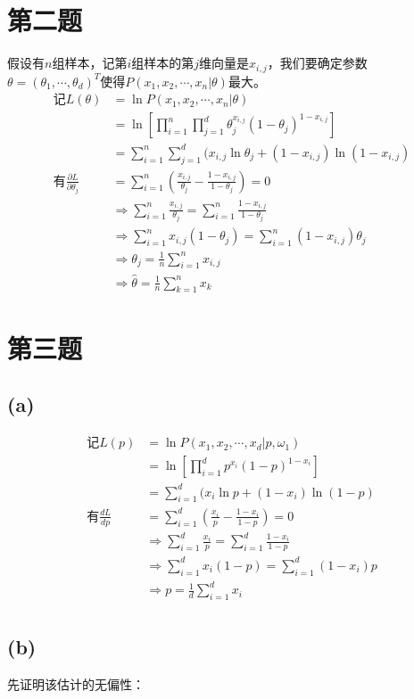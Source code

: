 \documentclass{ctexart}
\begin{document}
\section*{第二题}
假设有$n$组样本，记第$i$组样本的第$j$维向量是$x_{i,j}$，我们要确定参数$\theta=(\theta_1,\cdots,\theta_d)^T$使得$P(x_1,x_2,\cdots,x_n|\theta)$最大。
\begin{align*}
\textrm{记}L(\theta)&=\ln P(x_1,x_2,\cdots,x_n|\theta)\\
&=\ln [ \prod_{i=1}^n\prod_{j=1}^d \theta_j^{x_{i,j}}(1-\theta_j)^{1-x_{i,j}} ]\\
&=\sum_{i=1}^n\sum_{j=1}^d (x_{i,j}\ln \theta_j+(1-x_{i,j})\ln(1-x_{i,j})\\
\textrm{有}\frac{\partial L}{\partial \theta_j}&=\sum_{i=1}^n (\frac{x_{i,j}}{\theta_j}-\frac{1-x_{i,j}}{1-\theta_j})=0\\
&\Longrightarrow \sum_{i=1}^n \frac{x_{i,j}}{\theta_j}=\sum_{i=1}^n \frac{1-x_{i,j}}{1-\theta_j}\\
&\Longrightarrow \sum_{i=1}^n x_{i,j}(1-\theta_j)=\sum_{i=1}^n (1-x_{i,j})\theta_j\\
&\Longrightarrow \theta_j=\frac{1}{n}\sum_{i=1}^n x_{i,j}\\
&\Longrightarrow \hat{\theta}=\frac{1}{n}\sum_{k=1}^n x_k
\end{align*}
\section*{第三题}
\subsection*{(a)}
\begin{align*}
\textrm{记}L(p)&=\ln P(x_1,x_2,\cdots,x_d|p,\omega_1)\\
&=\ln [ \prod_{i=1}^d p^{x_i}(1-p)^{1-x_i} ]\\
&=\sum_{i=1}^d(x_i\ln p+(1-x_{i})\ln(1-p)\\
\textrm{有}\frac{dL}{dp}&=\sum_{i=1}^d (\frac{x_{i}}{p}-\frac{1-x_{i}}{1-p})=0\\
&\Longrightarrow \sum_{i=1}^d \frac{x_{i}}{p}=\sum_{i=1}^d \frac{1-x_{i}}{1-p}\\
&\Longrightarrow \sum_{i=1}^d x_{i}(1-p)=\sum_{i=1}^d (1-x_{i})p\\
&\Longrightarrow p=\frac{1}{d}\sum_{i=1}^d x_{i}\\
\end{align*}
\subsection*{(b)}
先证明该估计的无偏性：
\end{document}
